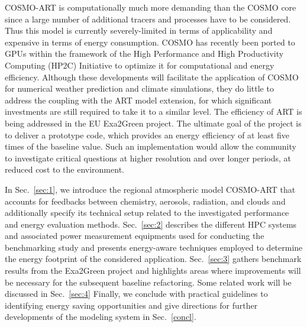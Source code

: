 COSMO-ART is  computationally much more demanding than  the COSMO core
since a  large number of additional  tracers and processes  have to be
considered.  Thus this model is currently severely-limited in terms of
applicability and expensive in terms of energy consumption.  COSMO has
recently  been  ported  to  GPUs  within the  framework  of  the  High
Performance  and  High  Productivity  Computing (HP2C)  Initiative  to
optimize it  for computational and energy  efficiency.  Although these
developments will  facilitate the  application of COSMO  for numerical
weather prediction and climate  simulations, they do little to address
the  coupling with  the  ART model  extension,  for which  significant
investments  are still required  to take  it to  a similar  level. The
efficiency of ART is being  addressed in the EU Exa2Green project. The
ultimate goal  of the  project is to  deliver a prototype  code, which
provides an energy  efficiency of at least five  times of the baseline
value.   Such   an  implementation   would  allow  the   community  to
investigate critical  questions at  higher resolution and  over longer
periods, at reduced cost  to the environment.  

In  Sec.~\ref{sec:1},  we  introduce  the regional  atmospheric  model
COSMO-ART  \citep{Vogel-2009}  that  accounts  for  feedbacks  between
chemistry,  aerosols, radiation, and  clouds and  additionally specify
its technical setup related to the investigated performance and energy
evaluation  methods.   Sec.~\ref{sec:2}  describes the  different  HPC
systems   and  associated  power   measurement  equipments   used  for
conducting the benchmarking study and presents energy-aware techniques
employed  to   determine  the  energy  footprint   of  the  considered
application.   Sec.~\ref{sec:3}  gathers  benchmark results  from  the
Exa2Green  project and  highlights  areas where  improvements will  be
necessary for the subsequent  baseline refactoring.  Some related work
will  be  discussed  in  Sec.~\ref{sec:4} Finally,  we  conclude  with
practical  guidelines to identifying  energy saving  opportunities and
give  directions for further  developments of  the modeling  system in
Sec.~\ref{concl}.

